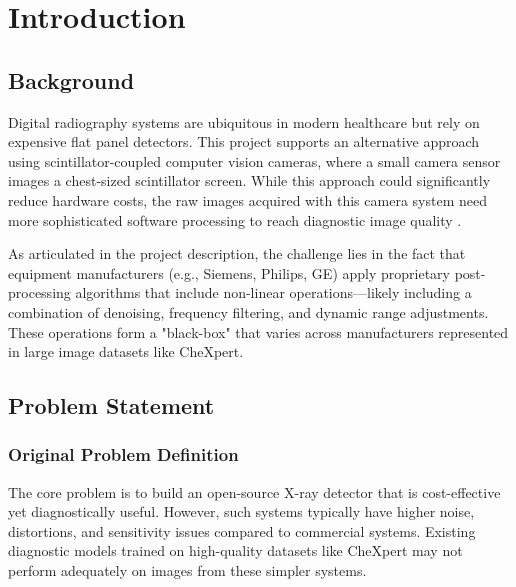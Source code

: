 \documentclass[nomenclature, english, bibtex]{kththesis}
\numberwithin{listing}{chapter}
\begin{document}
\ifnomenclature
    \cleardoublepage
    \printnomenclature
\fi

\label{pg:lastPageofPreface}
\mainmatter
\glsresetall
\renewcommand{\chaptermark}[1]{\markboth{#1}{}}
\chapter{Introduction}

\section{Background}
Digital radiography systems are ubiquitous in modern healthcare but rely on expensive flat panel detectors. This project supports an alternative approach using scintillator-coupled computer vision cameras, where a small camera sensor images a chest-sized scintillator screen. While this approach could significantly reduce hardware costs, the raw images acquired with this camera system need more sophisticated software processing to reach diagnostic image quality \cite{prokop2003principles}.

As articulated in the project description, the challenge lies in the fact that equipment manufacturers (e.g., Siemens, Philips, GE) apply proprietary post-processing algorithms that include non-linear operations—likely including a combination of denoising, frequency filtering, and dynamic range adjustments. These operations form a "black-box" that varies across manufacturers represented in large image datasets like CheXpert.

\section{Problem Statement}
\subsection{Original Problem Definition}
The core problem is to build an open-source X-ray detector that is cost-effective yet diagnostically useful. However, such systems typically have higher noise, distortions, and sensitivity issues compared to commercial systems. Existing diagnostic models trained on high-quality datasets like CheXpert may not perform adequately on images from these simpler systems.
\end{document}

